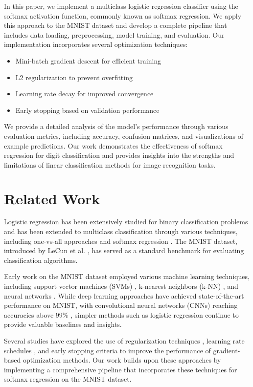 \documentclass[10pt,journal,compsoc]{IEEEtran}
\begin{document}
In this paper, we implement a multiclass logistic regression classifier using the softmax activation function, commonly known as softmax regression. We apply this approach to the MNIST dataset and develop a complete pipeline that includes data loading, preprocessing, model training, and evaluation. Our implementation incorporates several optimization techniques:

\begin{itemize}
    \item Mini-batch gradient descent for efficient training
    \item L2 regularization to prevent overfitting
    \item Learning rate decay for improved convergence
    \item Early stopping based on validation performance
\end{itemize}

We provide a detailed analysis of the model's performance through various evaluation metrics, including accuracy, confusion matrices, and visualizations of example predictions. Our work demonstrates the effectiveness of softmax regression for digit classification and provides insights into the strengths and limitations of linear classification methods for image recognition tasks.

\section{Related Work}
Logistic regression has been extensively studied for binary classification problems and has been extended to multiclass classification through various techniques, including one-vs-all approaches and softmax regression \cite{bishop2006pattern}. The MNIST dataset, introduced by LeCun et al. \cite{lecun1998gradient}, has served as a standard benchmark for evaluating classification algorithms.

Early work on the MNIST dataset employed various machine learning techniques, including support vector machines (SVMs) \cite{cortes1995support}, k-nearest neighbors (k-NN) \cite{cover1967nearest}, and neural networks \cite{lecun1998gradient}. While deep learning approaches have achieved state-of-the-art performance on MNIST, with convolutional neural networks (CNNs) reaching accuracies above 99\% \cite{ciresan2012multi}, simpler methods such as logistic regression continue to provide valuable baselines and insights.

Several studies have explored the use of regularization techniques \cite{ng2004feature}, learning rate schedules \cite{bottou2012stochastic}, and early stopping criteria \cite{prechelt1998early} to improve the performance of gradient-based optimization methods. Our work builds upon these approaches by implementing a comprehensive pipeline that incorporates these techniques for softmax regression on the MNIST dataset.
\end{document}
